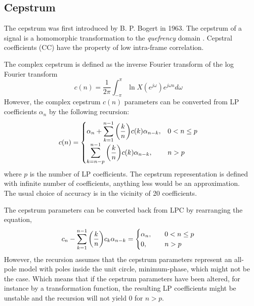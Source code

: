 \subsection{Cepstrum} %
\label{sub:cepstrum}
The cepstrum was first introduced by B. P. Bogert \etal \cite{bogert63} in 1963. The cepstrum of a signal is a homomorphic transformation to the \emph{quefrency} domain \cite{taletek}. Cepstral coefficients (CC) have the property of low intra-frame correlation.

The complex cepstrum is defined as the inverse Fourier transform of the log Fourier transform
\begin{equation}
	c(n) = \frac{1}{2\pi}\int_{-\pi}^{\pi} \ln X(e^{j\omega}) e^{j\omega n}d\omega
	\label{eq:complex_cepstrum}
\end{equation}
However, the complex cepstrum $c(n)$ parameters can be converted from LP coefficients $\alpha_n$ by the following recursion:
\begin{equation}
	c(n) = \begin{cases}
		\alpha_n+{\displaystyle\sum_{k=1}^{n-1} \left(\frac{k}{n}\right)} c(k) \alpha_{n-k}, & 0<n\leq p\\
		{\displaystyle\sum_{k=n-p}^{n-1} \left(\frac{k}{n}\right)} c(k) \alpha_{n-k}, & n > p\\
	\end{cases}
	\label{eq:ar2cc}
\end{equation}
where $p$ is the number of LP coefficients. The cepstrum representation is defined with infinite number of coefficients, anything less would be an approximation. The usual choice of accuracy is in the vicinity of 20 coefficients.

The cepstrum parameters can be converted back from LPC by rearranging the equation,
\begin{equation}
	c_n-{\displaystyle\sum_{k=1}^{n-1} \left(\frac{k}{n}\right)} c_k \alpha_{n-k} = \begin{cases}
		\alpha_n, &\quad 0< n \leq p\\
		0, &\quad n > p
	\end{cases}
	\label{eq:cc2ar}
\end{equation}
However, the recursion assumes that the cepstrum parameters represent an all-pole model with poles inside the unit circle, minimum-phase, which might not be the case. Which means that if the cepstrum parameters have been altered, for instance by a transformation function, the resulting LP coefficients might be unstable and the recursion will not yield 0 for $n>p$.  

